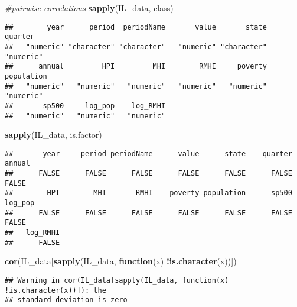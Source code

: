 \documentclass[
]{article}
\newenvironment{Shaded}{\begin{snugshade}}{\end{snugshade}}
\newcommand{\CommentTok}[1]{\textcolor[rgb]{0.56,0.35,0.01}{\textit{#1}}}
\newcommand{\ControlFlowTok}[1]{\textcolor[rgb]{0.13,0.29,0.53}{\textbf{#1}}}
\newcommand{\KeywordTok}[1]{\textcolor[rgb]{0.13,0.29,0.53}{\textbf{#1}}}
\newcommand{\NormalTok}[1]{#1}
\newcommand{\OperatorTok}[1]{\textcolor[rgb]{0.81,0.36,0.00}{\textbf{#1}}}
\begin{document}
\begin{Shaded}
\begin{Highlighting}[]
\CommentTok{#pairwise correlations}
\KeywordTok{sapply}\NormalTok{(IL_data, class)}
\end{Highlighting}
\end{Shaded}

\begin{verbatim}
##        year      period  periodName       value       state     quarter 
##   "numeric" "character" "character"   "numeric" "character"   "numeric" 
##      annual         HPI         MHI        RMHI     poverty  population 
##   "numeric"   "numeric"   "numeric"   "numeric"   "numeric"   "numeric" 
##       sp500     log_pop    log_RMHI 
##   "numeric"   "numeric"   "numeric"
\end{verbatim}

\begin{Shaded}
\begin{Highlighting}[]
\KeywordTok{sapply}\NormalTok{(IL_data, is.factor)}
\end{Highlighting}
\end{Shaded}

\begin{verbatim}
##       year     period periodName      value      state    quarter     annual 
##      FALSE      FALSE      FALSE      FALSE      FALSE      FALSE      FALSE 
##        HPI        MHI       RMHI    poverty population      sp500    log_pop 
##      FALSE      FALSE      FALSE      FALSE      FALSE      FALSE      FALSE 
##   log_RMHI 
##      FALSE
\end{verbatim}

\begin{Shaded}
\begin{Highlighting}[]
\KeywordTok{cor}\NormalTok{(IL_data[}\KeywordTok{sapply}\NormalTok{(IL_data, }\ControlFlowTok{function}\NormalTok{(x) }\OperatorTok{!}\KeywordTok{is.character}\NormalTok{(x))])}
\end{Highlighting}
\end{Shaded}

\begin{verbatim}
## Warning in cor(IL_data[sapply(IL_data, function(x) !is.character(x))]): the
## standard deviation is zero
\end{verbatim}
\end{document}
